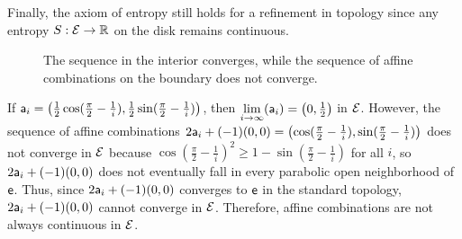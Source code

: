 \begin{example}
	Finally, the axiom of entropy still holds for a refinement in topology since any entropy $S : \Ens \to \mathbb{R}$ on the disk remains continuous.
	
	\begin{figure}[H]
		\centering
		\caption{The sequence in the interior converges, while the sequence of affine combinations on the boundary does not converge.}
	\end{figure}
	
	If $\ens[a]_i = \left(\frac{1}{2}\cos(\frac{\pi}{2} - \frac{1}{i}), \frac{1}{2}\sin(\frac{\pi}{2} - \frac{1}{i})\right)$, then $\lim\limits_{i \to \infty}(\ens[a]_i) = \left(0, \frac{1}{2}\right)$ in $\Ens$. However, the sequence of affine combinations $2\ens[a]_i + (-1)(0,0) = \left(\cos(\frac{\pi}{2} - \frac{1}{i}), \sin(\frac{\pi}{2} - \frac{1}{i})\right)$ does not converge in $\Ens$ because $\cos(\frac{\pi}{2} - \frac{1}{i})^2 \ge 1 - \sin(\frac{\pi}{2} - \frac{1}{i})$ for all $i$, so $2\ens[a]_i + (-1)(0,0)$ does not eventually fall in every parabolic open neighborhood of $\ens[e]$. Thus, since $2\ens[a]_i + (-1)(0,0)$ converges to $\ens[e]$ in the standard topology, $2\ens[a]_i + (-1)(0,0)$ cannot converge in $\Ens$. Therefore, affine combinations are not always continuous in $\Ens$.
\end{example}


